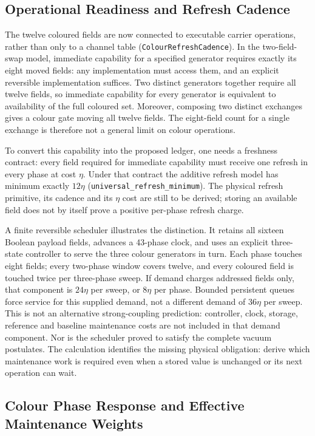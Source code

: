 \subsection{Operational Readiness and Refresh Cadence}

The twelve coloured fields are now connected to executable carrier operations, rather than only to a channel table (\texttt{ColourRefreshCadence}). In the two-field-swap model, immediate capability for a specified generator requires exactly its eight moved fields: any implementation must access them, and an explicit reversible implementation suffices. Two distinct generators together require all twelve fields, so immediate capability for every generator is equivalent to availability of the full coloured set. Moreover, composing two distinct exchanges gives a colour gate moving all twelve fields. The eight-field count for a single exchange is therefore not a general limit on colour operations.

To convert this capability into the proposed ledger, one needs a freshness contract: every field required for immediate capability must receive one refresh in every phase at cost $\eta$. Under that contract the additive refresh model has minimum exactly $12\eta$ (\texttt{universal\_refresh\_minimum}). The physical refresh primitive, its cadence and its $\eta$ cost are still to be derived; storing an available field does not by itself prove a positive per-phase refresh charge.

A finite reversible scheduler illustrates the distinction. It retains all sixteen Boolean payload fields, advances a 43-phase clock, and uses an explicit three-state controller to serve the three colour generators in turn. Each phase touches eight fields; every two-phase window covers twelve, and every coloured field is touched twice per three-phase sweep. If demand charges addressed fields only, that component is $24\eta$ per sweep, or $8\eta$ per phase. Bounded persistent queues force service for this supplied demand, not a different demand of $36\eta$ per sweep. This is not an alternative strong-coupling prediction: controller, clock, storage, reference and baseline maintenance costs are not included in that demand component. Nor is the scheduler proved to satisfy the complete vacuum postulates. The calculation identifies the missing physical obligation: derive which maintenance work is required even when a stored value is unchanged or its next operation can wait.

\subsection{Colour Phase Response and Effective Maintenance Weights}

